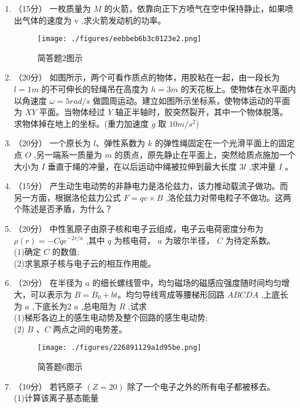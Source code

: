

\begin{enumerate}
\item （15分）
一枚质量为 $M$ 的火箭，依靠向正下方喷气在空中保持静止，如果喷出气体的速度为  $\mathrm v$ ,求火箭发动机的功率。\\
\begin{figure}[ht]
\centering
\texttt{[image: ./figures/eebbeb6b3c0123e2.png]}
\caption{简答题2图示} \label{fig_USTC15_1}
\end{figure}
\item （20分）
如图所示，两个可看作质点的物体，用胶粘在一起，由一段长为 $l=1m$ 的不可伸长的轻绳吊在高度为 $h=3m$ 的天花板上。使物体在水平面内以角速度 $\omega=5rad/s$ 做圆周运动。建立如图所示坐标系，使物体运动的平面为 $XY$ 平面。当物体经过 $Y$ 轴正半轴时，胶突然裂开，其中一个物体脱落。求物体掉在地上的坐标。(重力加速度 $g$ 取 $10m/s^2$)
\item （20分）
一个原长为 $l$、弹性系数为 $k$ 的弹性绳固定在一个光滑平面上的固定点 $O$ ,另一端系一质量为 $m$ 的质点，原先静止在平面上，突然给质点施加一个大小为 $I$ 垂直于绳的冲量，在以后运动中绳被拉伸到最大长度 3$l$ ,求冲量 $I$ 。
\item （15分）
产生动生电动势的非静电力是洛伦兹力，该力推动载流子做功。而另一方面，根据洛伦兹力公式 $F=qv\times B$ ,洛伦兹力对带电粒子不做功。这两个陈述是否矛盾，为什么？
\item （20分）
中性氢原子由原子核和电子云组成，电子云电荷密度分布为 $\rho(r)=-Cqe^{-2r/a}$ ,其中 $q$ 为核电荷， $a$ 为玻尔半径， $C$ 为待定系数。\\
(1)确定 $C$ 的数值;\\
(2)求氢原子核与电子云的相互作用能。
\item （20分）
在半径为 $a$ 的细长螺线管中，均匀磁场的磁感应强度随时间均匀增大，可以表示为 $B=B_0+bt$。均匀导线弯成等腰梯形回路 $ABCDA$ ,上底长为 $a$ ,下底长为2 $a$ ,总电阻为 $R$ ,试求\\
(1)梯形各边上的感生电动势及整个回路的感生电动势;\\
(2) $B$ 、$C$ 两点之间的电势差。\\
\begin{figure}[ht]
\centering
\texttt{[image: ./figures/226891129a1d95be.png]}
\caption{简答题6图示} \label{fig_USTC15_2}
\end{figure}
\item （10分）
若钙原子 $(Z=20)$ 除了一个电子之外的所有电子都被移去。\\
(1)计算该离子基态能量\\

\end{enumerate}
